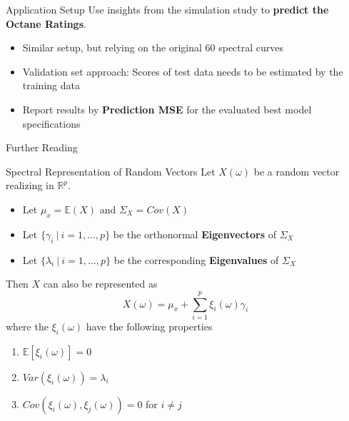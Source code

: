 \documentclass{beamer}
\begin{document}
	\begin{frame}{Application Setup}
	Use insights from the simulation study to \textbf{predict the Octane Ratings}.
	\vspace{0.4cm}
		\begin{itemize}
			\item Similar setup, but relying on the original 60 spectral curves
			\item Validation set approach:	Scores of test data needs to be estimated by the training data
			\item Report results by \textbf{Prediction MSE} for the evaluated best model specifications
		\end{itemize}
	\end{frame}
	
	\begin{frame}{Further Reading}
		\nocite{hsing_theoretical_2015}
		\nocite{kokoszka_introduction_2017}
		\nocite{Bohacs_Ovadi_Salgo1998}
		\nocite{Reiss_2007b}
		\nocite{ramsay_functional_2005}
		\AtNextBibliography{\tiny}
		\printbibliography[heading=none]
	\end{frame}
	
	
	\begin{frame}{Spectral Representation of Random Vectors}\label{spectral}
		Let $X(\omega)$ be a random vector realizing in $\mathbb{R}^p$.
		
		\begin{itemize}
			\item Let $\mu_x = \mathbb{E}(X)$ and $\Sigma_X = Cov(X)$
			\item Let $\{\gamma_i \: \vert \: i = 1, \dots, p\}$ be the orthonormal \textbf{Eigenvectors} of $\Sigma_X$
			\item Let $\{\lambda_i \: \vert \: i = 1, \dots, p\}$ be the corresponding \textbf{Eigenvalues} of $\Sigma_X$
		\end{itemize}
		
		\vspace{0.2cm}
		Then $X$ can also be represented as
		$$X(\omega) = \mu_x + \sum_{i = 1}^{p} \xi_i(\omega) \gamma_i$$
		where the $\xi_i(\omega)$ have the following properties
		
		\begin{multicols}{2}
			\begin{enumerate}
				\item $\mathbb{E}[\xi_i(\omega)] = 0$
				\item $Var(\xi_i(\omega)) = \lambda_i$
				\item $Cov(\xi_i(\omega), \xi_j(\omega)) = 0$ for $i \neq j$
			\end{enumerate}
		\end{multicols}
	
		\hyperlink{KLE}{}
	\end{frame}
\end{document}
